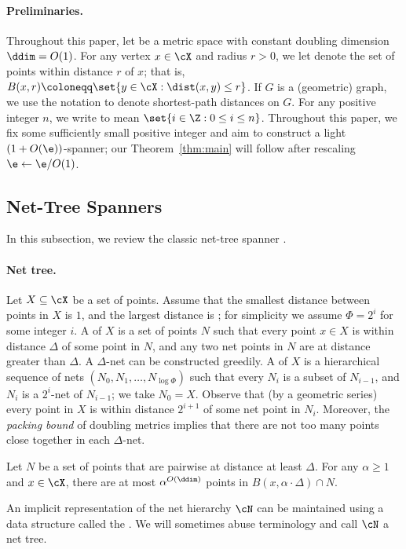 \paragraph{Preliminaries.} Throughout this paper, let  be a metric space with constant doubling dimension $\ddim = O(1)$.
For any vertex $x \in \cX$ and radius $r > 0$, we let  denote the set of points within distance $r$ of $x$; that is, $B(x,r) \coloneqq \set{y \in \cX : \dist(x,y) \le r}$.
If $G$ is a (geometric) graph, we use the notation  to denote shortest-path distances on $G$. For any positive integer $n$, we write \EMPH{$[n]$} to mean $\set{i \in \Z: 0 \le i \le n}$. Throughout this paper, we fix some sufficiently small positive integer  and aim to construct a light $(1+O(\e))$-spanner; our Theorem~\ref{thm:main} will follow after rescaling $\e \gets \e / O(1)$.
%
\subsection{Net-Tree Spanners}
%
In this subsection, we review the classic net-tree spanner \cite{gao2004deformable}.
%
\paragraph{Net tree.}  Let $X \subseteq \cX$ be a set of points. Assume that the smallest distance between points in $X$ is $1$, and the largest distance is \EMPH{$\Phi$}; for simplicity we assume $\Phi = 2^i$ for some integer $i$.
A  of $X$ is a set of points $N$ such that every point $x \in X$ is within distance $\Delta$ of some point in $N$, and any two net points in $N$ are at distance greater than $\Delta$. A $\Delta$-net can be constructed greedily.
A  of $X$ is a hierarchical sequence of nets $(N_0, N_1, \ldots, N_{\log \Phi})$ such that every $N_i$ is a subset of $N_{i-1}$, and $N_i$ is a $2^{i}$-net of $N_{i-1}$;
we take $N_0 = X$. Observe that (by a geometric series) every point in $X$ is within distance $2^{i+1}$ of some net point in $N_i$. Moreover, the \emph{packing bound} of doubling metrics implies that there are not too many points close together in each $\Delta$-net.
\begin{observation}
\label{obs:packing}
    Let $N$ be a set of points that are pairwise at distance at least $\Delta$. For any $\alpha \ge 1$ and $x \in \cX$, there are at most $\alpha^{O(\ddim)}$ points in $B(x,\alpha \cdot \Delta) \cap N$.
\end{observation}
% 
An implicit representation of the net hierarchy $\cN$ can be maintained using a data structure called the  \cite{gao2004deformable,KL04,HM06}.
We will sometimes abuse terminology and call $\cN$ a net tree.
%
